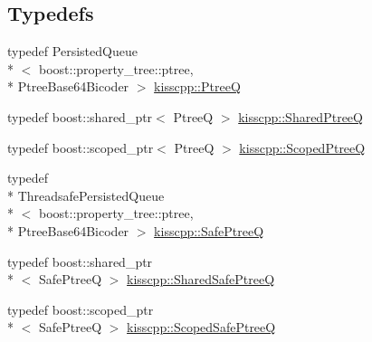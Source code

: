 \subsection*{Typedefs}
\begin{DoxyCompactItemize}
\item 
typedef Persisted\-Queue\\*
$<$ boost\-::property\-\_\-tree\-::ptree, \\*
Ptree\-Base64\-Bicoder $>$ \hyperlink{a00089_af1d6724570f46ac378171bd45ddf6903}{kisscpp\-::\-Ptree\-Q}
\item 
typedef boost\-::shared\-\_\-ptr$<$ Ptree\-Q $>$ \hyperlink{a00089_aecf9f29bb4c41e0d4dbc74731a3020cd}{kisscpp\-::\-Shared\-Ptree\-Q}
\item 
typedef boost\-::scoped\-\_\-ptr$<$ Ptree\-Q $>$ \hyperlink{a00089_a64a7093fe1bdc3f323b469e800eebc7f}{kisscpp\-::\-Scoped\-Ptree\-Q}
\item 
typedef \\*
Threadsafe\-Persisted\-Queue\\*
$<$ boost\-::property\-\_\-tree\-::ptree, \\*
Ptree\-Base64\-Bicoder $>$ \hyperlink{a00089_ac48ab954f4898861f383b80e857e17cc}{kisscpp\-::\-Safe\-Ptree\-Q}
\item 
typedef boost\-::shared\-\_\-ptr\\*
$<$ Safe\-Ptree\-Q $>$ \hyperlink{a00089_ae95e969e7f5dfd1f36842ac9aa25c7ea}{kisscpp\-::\-Shared\-Safe\-Ptree\-Q}
\item 
typedef boost\-::scoped\-\_\-ptr\\*
$<$ Safe\-Ptree\-Q $>$ \hyperlink{a00089_a20653e6629a85affc6a1b8529e0a8da0}{kisscpp\-::\-Scoped\-Safe\-Ptree\-Q}
\end{DoxyCompactItemize}
